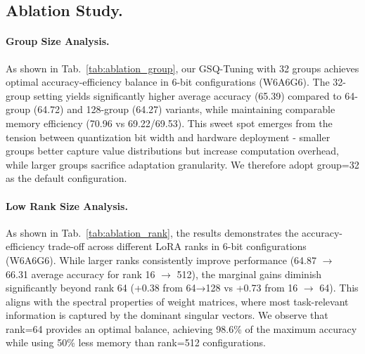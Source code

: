 \subsection{Ablation Study.}\label{ablation}
\paragraph{Group Size Analysis.} As shown in Tab.~\ref{tab:ablation_group}, our GSQ-Tuning with 32 groups achieves optimal accuracy-efficiency balance in 6-bit configurations (W6A6G6). The 32-group setting yields significantly higher average accuracy (65.39) compared to 64-group (64.72) and 128-group (64.27) variants, while maintaining comparable memory efficiency (70.96 vs 69.22/69.53). This sweet spot emerges from the tension between quantization bit width and hardware deployment - smaller groups better capture value distributions but increase computation overhead, while larger groups sacrifice adaptation granularity. We therefore adopt group=32 as the default configuration.






\paragraph{Low Rank Size Analysis.} As shown in Tab.~\ref{tab:ablation_rank}, the results demonstrates the accuracy-efficiency trade-off across different LoRA ranks in 6-bit configurations (W6A6G6). While larger ranks consistently improve performance (64.87 $\rightarrow$ 66.31 average accuracy for rank 16 $\rightarrow$ 512), the marginal gains diminish significantly beyond rank 64 (+0.38 from 64→128 vs +0.73 from 16 $\rightarrow$ 64). This aligns with the spectral properties of weight matrices, where most task-relevant information is captured by the dominant singular vectors. We observe that rank=64 provides an optimal balance, achieving 98.6\% of the maximum accuracy while using 50\% less memory than rank=512 configurations.



